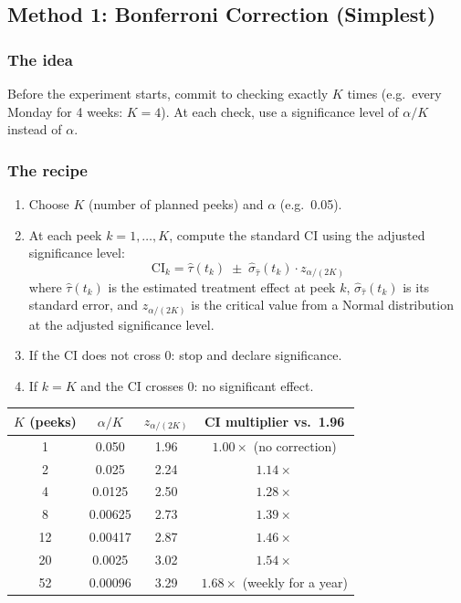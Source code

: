 \documentclass[12pt, a4paper]{article}
\begin{document}
\subsection{Method 1: Bonferroni Correction (Simplest)}

\subsubsection*{The idea}

Before the experiment starts, commit to checking exactly $K$ times
(e.g.\ every Monday for 4 weeks: $K = 4$).  At each check, use a
significance level of $\alpha/K$ instead of $\alpha$.

\subsubsection*{The recipe}

\begin{enumerate}[nosep]
  \item Choose $K$ (number of planned peeks) and $\alpha$ (e.g.\ 0.05).
  \item At each peek $k = 1, \ldots, K$, compute the standard CI using
        the adjusted significance level:
        \[
          \text{CI}_k = \hat{\tau}(t_k) \;\pm\;
          \hat{\sigma}_{\hat{\tau}}(t_k) \cdot z_{\alpha/(2K)}
        \]
        where $\hat{\tau}(t_k)$ is the estimated treatment effect at peek $k$,
        $\hat{\sigma}_{\hat{\tau}}(t_k)$ is its standard error, and
        $z_{\alpha/(2K)}$ is the critical value from a Normal distribution
        at the adjusted significance level.
  \item If the CI does not cross 0: stop and declare significance.
  \item If $k = K$ and the CI crosses 0: no significant effect.
\end{enumerate}

\begin{center}
\renewcommand{\arraystretch}{1.3}
\begin{tabular}{@{} c c c c @{}}
\toprule
$K$ (peeks) & $\alpha/K$ & $z_{\alpha/(2K)}$ & CI multiplier vs.\ 1.96 \\
\midrule
1  & 0.050  & 1.96 & $1.00\times$ (no correction) \\
2  & 0.025  & 2.24 & $1.14\times$ \\
4  & 0.0125 & 2.50 & $1.28\times$ \\
8  & 0.00625 & 2.73 & $1.39\times$ \\
12 & 0.00417 & 2.87 & $1.46\times$ \\
20 & 0.0025  & 3.02 & $1.54\times$ \\
52 & 0.00096 & 3.29 & $1.68\times$ (weekly for a year) \\
\bottomrule
\end{tabular}
\end{center}
\end{document}
